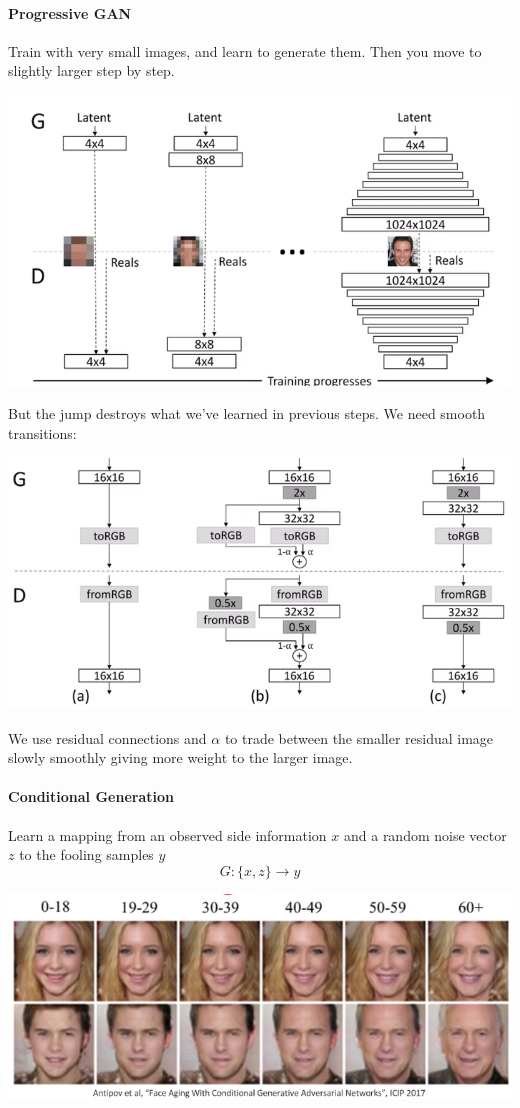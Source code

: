\documentclass[10pt]{report}
\begin{document}
\paragraph{Progressive GAN} Train with very small images, and learn to generate them. Then you move to slightly larger step by step.
\begin{center}
	\includegraphics[scale=0.5]{150.png}
\end{center}
But the jump destroys what we've learned in previous steps. We need smooth transitions:
\begin{center}
	\includegraphics[scale=0.5]{151.png}
\end{center}
We use residual connections and $\alpha$ to trade between the smaller residual image slowly smoothly giving more weight to the larger image.
\paragraph{Conditional Generation} Learn a mapping from an observed side information $x$ and a random noise vector $z$ to the fooling samples $y$
$$G:\{x,z\}\rightarrow y$$
\begin{center}
	\includegraphics[scale=0.5]{152.png}
\end{center}
\end{document}
